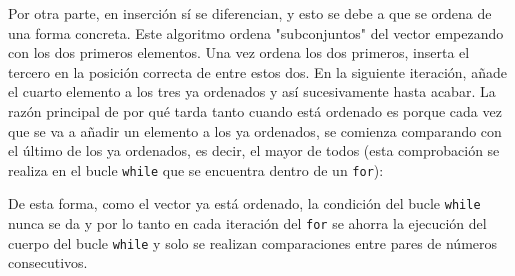 \documentclass[10pt,a4paper]{article}
\begin{document}
Por otra parte, en inserción sí se diferencian, y esto se debe a que se ordena de una forma concreta. Este algoritmo ordena "subconjuntos" del vector empezando con los dos primeros elementos. Una vez ordena los dos primeros, inserta el tercero en la posición correcta de entre estos dos. En la siguiente iteración, añade el cuarto elemento a los tres ya ordenados y así sucesivamente hasta acabar. La razón principal de por qué tarda tanto cuando está ordenado es porque cada vez que se va a añadir un elemento a los ya ordenados, se comienza comparando con el último de los ya ordenados, es decir, el mayor de todos (esta comprobación se realiza en el bucle \texttt{while} que se encuentra dentro de un \texttt{for}):



De esta forma, como el vector ya está ordenado, la condición del bucle \texttt{while} nunca se da y por lo tanto en cada iteración del \texttt{for} se ahorra la ejecución del cuerpo del bucle \texttt{while} y solo se realizan comparaciones entre pares de números consecutivos.
\end{document}
